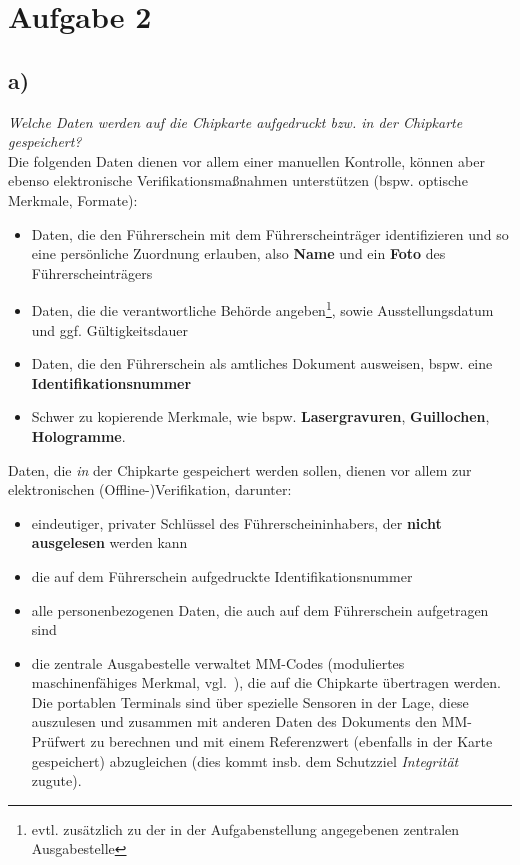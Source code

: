 \chapter{Aufgabe 2}

\section{a)}

\textit{Welche Daten werden auf die Chipkarte aufgedruckt bzw. in der Chipkarte gespeichert?}\\

\noindent
Die folgenden Daten dienen vor allem einer manuellen Kontrolle, können aber ebenso elektronische Verifikationsmaßnahmen unterstützen (bspw. optische Merkmale, Formate):

\begin{itemize}
    \itemsep0.5em
    \item Daten, die den Führerschein mit dem Führerscheinträger identifizieren und so eine persönliche Zuordnung erlauben, also \textbf{Name} und ein \textbf{Foto} des Führerscheinträgers
    \item Daten, die die verantwortliche Behörde angeben\footnote{
        evtl. zusätzlich zu der in der Aufgabenstellung angegebenen zentralen Ausgabestelle
    }, sowie Ausstellungsdatum und ggf. Gültigkeitsdauer
    \item Daten, die den Führerschein als amtliches Dokument ausweisen, bspw. eine \textbf{Identifikationsnummer}
    \item Schwer zu kopierende Merkmale, wie bspw. \textbf{Lasergravuren}, \textbf{Guillochen}, \textbf{Hologramme}.
\end{itemize}

\noindent
Daten, die \textit{in} der Chipkarte gespeichert werden sollen, dienen vor allem zur elektronischen (Offline-)Verifikation, darunter:

\begin{itemize}
    \itemsep0.5em
    \item eindeutiger, privater Schlüssel des Führerscheininhabers, der \textbf{nicht ausgelesen} werden kann
    \item die auf dem Führerschein aufgedruckte Identifikationsnummer
    \item alle personenbezogenen Daten, die auch auf dem Führerschein aufgetragen sind
    \item die zentrale Ausgabestelle verwaltet MM-Codes (moduliertes maschinenfähiges Merkmal, vgl.~\cite[74]{ITS5}), die auf die Chipkarte übertragen werden.
    Die portablen Terminals sind über spezielle Sensoren in der Lage, diese auszulesen und zusammen mit anderen Daten des Dokuments den MM-Prüfwert zu berechnen und mit einem Referenzwert (ebenfalls in der Karte gespeichert) abzugleichen (dies kommt insb. dem Schutzziel \textit{Integrität} zugute).
\end{itemize}

